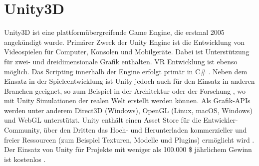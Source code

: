 

\section{Unity3D}
Unity3D ist eine plattformübergreifende Game Engine, die erstmal 2005 angekündigt wurde.
Primärer Zweck der Unity Engine ist die Entwicklung von Videospielen für Computer, Konsolen und Mobilgeräte.
Dabei ist Unterstützung für zwei- und dreidimensionale Grafik enthalten.
VR Entwicklung ist ebenso möglich.
Das Scripting innerhalb der Engine erfolgt primär in C\# \cite{freecodecamp.unityIntroduction}.
Neben dem Einsatz in der Spieleentwicklung ist Unity jedoch auch für den Einsatz in anderen Branchen geeignet, so zum Beispiel in der Architektur oder der Forschung \cite[30]{waidner.2020}, wo mit Unity Simulationen der realen Welt erstellt werden können.
Als Grafik-APIs werden unter anderem Direct3D (Windows), OpenGL (Linux, macOS, Windows) und WebGL unterstützt.
Unity enthält einen Asset Store für die Entwickler-Community, über den Dritten das Hoch- und Herunterladen kommerzieller und freier Ressourcen (zum Beispiel Texturen, Modelle und Plugins) ermöglicht wird \cite{freecodecamp.unityIntroduction}.
Der Einsatz von Unity für Projekte mit weniger als 100.000 \$ jährlichem Gewinn ist kostenlos \cite{unityPersonal}.


